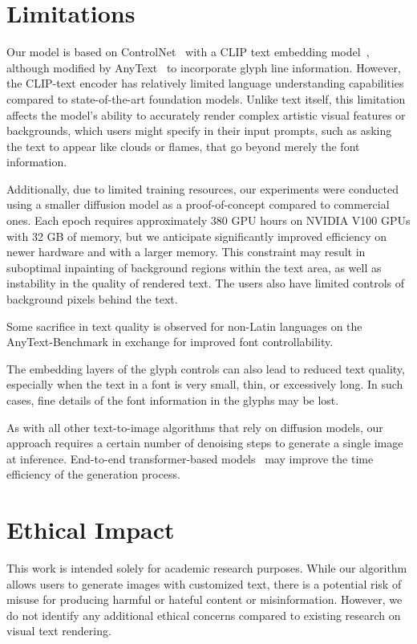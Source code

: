 \section{Limitations}
Our model is based on ControlNet~\cite{zhang2023adding} with a CLIP text embedding model~\cite{radford2021learning}, although modified by AnyText~\cite{tuo2023anytext} to incorporate glyph line information. However, the CLIP-text encoder has relatively limited language understanding capabilities compared to state-of-the-art foundation models. Unlike text itself, this limitation affects the model's ability to accurately render complex artistic visual features or backgrounds, which users might specify in their input prompts, such as asking the text to appear like clouds or flames, that go beyond merely the font information.

Additionally, due to limited training resources, our experiments were conducted using a smaller diffusion model as a proof-of-concept compared to commercial ones. Each epoch requires approximately 380 GPU hours on NVIDIA V100 GPUs with 32 GB of memory, but we anticipate significantly improved efficiency on newer hardware and with a larger memory. This constraint may result in suboptimal inpainting of background regions within the text area, as well as instability in the quality of rendered text. The users also have limited controls of background pixels behind the text. 

Some sacrifice in text quality is observed for non-Latin languages on the AnyText-Benchmark in exchange for improved font controllability.

The embedding layers of the glyph controls can also lead to reduced text quality, especially when the text in a font is very small, thin, or excessively long. In such cases, fine details of the font information in the glyphs may be lost. 

As with all other text-to-image algorithms that rely on diffusion models, our approach requires a certain number of denoising steps to generate a single image at inference. End-to-end transformer-based models~\cite{xie2024show} may improve the time efficiency of the generation process.




\section{Ethical Impact}
This work is intended solely for academic research purposes. While our algorithm allows users to generate images with customized text, there is a potential risk of misuse for producing harmful or hateful content or misinformation. However, we do not identify any additional ethical concerns compared to existing research on visual text rendering.